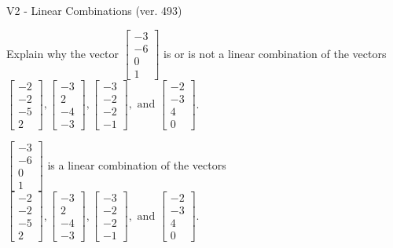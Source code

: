\begin{exercise}
  \begin{exerciseTitle}V2 - Linear Combinations (ver. 493)\end{exerciseTitle}
  \begin{exerciseStatement}
    Explain why the vector \(\left[\begin{array}{c}
-3 \\
-6 \\
0 \\
1
\end{array}\right]\)  is or is not a linear 
	combination of the vectors \(\left[\begin{array}{c}
-2 \\
-2 \\
-5 \\
2
\end{array}\right] , \left[\begin{array}{c}
-3 \\
2 \\
-4 \\
-3
\end{array}\right] , \left[\begin{array}{c}
-3 \\
-2 \\
-2 \\
-1
\end{array}\right] , \text{ and } \left[\begin{array}{c}
-2 \\
-3 \\
4 \\
0
\end{array}\right]\).
	


  \end{exerciseStatement}
  \begin{exerciseAnswer}
   \(\left[\begin{array}{c}
-3 \\
-6 \\
0 \\
1
\end{array}\right]\) 
  	 is  
	a linear combination of the vectors \(\left[\begin{array}{c}
-2 \\
-2 \\
-5 \\
2
\end{array}\right] , \left[\begin{array}{c}
-3 \\
2 \\
-4 \\
-3
\end{array}\right] , \left[\begin{array}{c}
-3 \\
-2 \\
-2 \\
-1
\end{array}\right] , \text{ and } \left[\begin{array}{c}
-2 \\
-3 \\
4 \\
0
\end{array}\right]\).


\end{exerciseAnswer}
\end{exercise}
